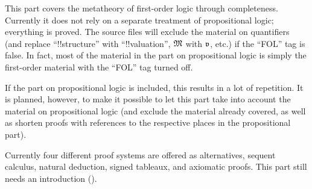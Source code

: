 \documentclass[../../include/open-logic-part]{subfiles}
\begin{document}

\begin{editorial}
  This part covers the metatheory of first-order logic through
  completeness.  Currently it does not rely on a separate treatment of
  propositional logic; everything is proved.  The source files will
  exclude the material on quantifiers (and replace ``!!{structure}''
  with ``!!{valuation}'', $\Struct{M}$ with $\pAssign{v}$, etc.) if
  the ``FOL'' tag is false. In fact, most of the material in the part
  on propositional logic is simply the first-order material with the
  ``FOL'' tag turned off.

  If the part on propositional logic is included, this results in a
  lot of repetition. It is planned, however, to make it possible to
  let this part take into account the material on propositional logic
  (and exclude the material already covered, as well as shorten proofs
  with references to the respective places in the propositional
  part).

  Currently four different proof systems are offered as
  alternatives, sequent calculus, natural deduction, signed tableaux,
  and axiomatic proofs. This part still needs an introduction
  ().
\end{editorial}










\OLEndPartHook
\end{document}
